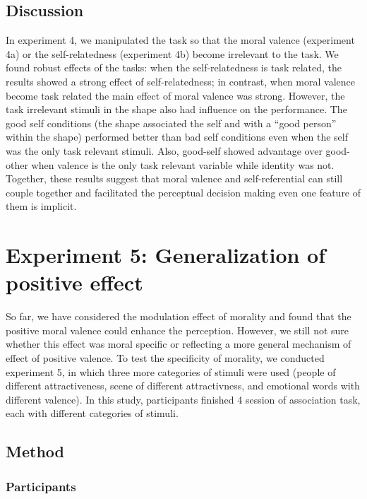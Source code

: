 \documentclass[
  english,
  man]{apa6}
\begin{document}
\hypertarget{discussion-4}{%
\subsection{Discussion}\label{discussion-4}}

In experiment 4, we manipulated the task so that the moral valence (experiment 4a) or the self-relatedness (experiment 4b) become irrelevant to the task. We found robust effects of the tasks: when the self-relatedness is task related, the results showed a strong effect of self-relatedness; in contrast, when moral valence become task related the main effect of moral valence was strong. However, the task irrelevant stimuli in the shape also had influence on the performance. The good self conditions (the shape associated the self and with a \enquote{good person} within the shape) performed better than bad self conditions even when the self was the only task relevant stimuli. Also, good-self showed advantage over good-other when valence is the only task relevant variable while identity was not. Together, these results suggest that moral valence and self-referential can still couple together and facilitated the perceptual decision making even one feature of them is implicit.

\hypertarget{experiment-5-generalization-of-positive-effect}{%
\section{Experiment 5: Generalization of positive effect}\label{experiment-5-generalization-of-positive-effect}}

So far, we have considered the modulation effect of morality and found that the positive moral valence could enhance the perception. However, we still not sure whether this effect was moral specific or reflecting a more general mechanism of effect of positive valence. To test the specificity of morality, we conducted experiment 5, in which three more categories of stimuli were used (people of different attractiveness, scene of different attractivness, and emotional words with different valence). In this study, participants finished 4 session of association task, each with different categories of stimuli.

\hypertarget{method-6}{%
\subsection{Method}\label{method-6}}

\hypertarget{participants-8}{%
\subsubsection{Participants}\label{participants-8}}
\end{document}
